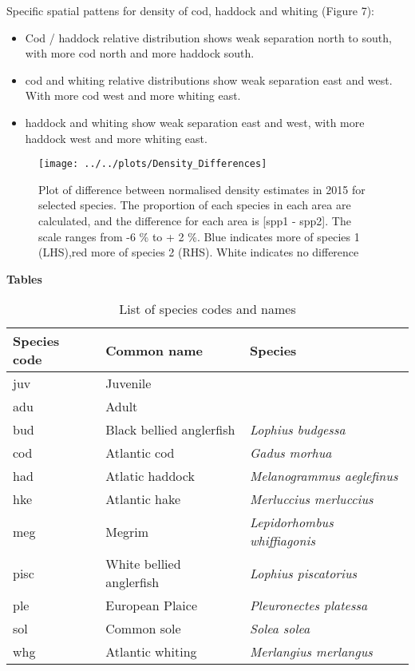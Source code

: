 \documentclass[11pt]{article}
\begin{document}
\newpage

Specific spatial pattens for density of cod, haddock and whiting (Figure 7):

\begin{itemize}
	\item Cod / haddock relative distribution shows weak separation north to
	south, with more cod north and more haddock south.
	\item cod and whiting relative distributions show weak separation east
		and west. With more cod west and more whiting east.
	\item haddock and whiting show weak separation east and west, with
		more haddock west and more whiting east.
\end{itemize}

\begin{figure}[!ht]
	\texttt{[image: ../../plots/Density\_Differences]}
	\label{fig:DensityDiff}
	\caption{Plot of difference between normalised density estimates in
		2015 for selected species. The proportion of each species in
		each area are calculated, and the difference for each area is
		[spp1 - spp2]. The scale ranges from -6 \% to + 2 \%. Blue indicates
		more of species 1 (LHS),red more of species 2 (RHS).  White
		indicates no difference}
\end{figure}



\newpage

\textbf{Tables}

\begin{table}[!ht]
	\caption{List of species codes and names}
	\center
	\begin{tabular}{ p{3cm} p{4cm} p{5cm} }
		\hline
		Species code & Common name              & Species \\
		\hline
		juv          & Juvenile                 & \\
		adu          & Adult                    & \\
		\hline
		bud          & Black bellied anglerfish & \textit{Lophius budgessa} \\
		cod          & Atlantic cod             & \textit{Gadus morhua} \\
		had          & Atlatic haddock          & \textit{Melanogrammus aeglefinus} \\
		hke          & Atlantic hake            & \textit{Merluccius merluccius} \\
		meg          & Megrim                   & \textit{Lepidorhombus whiffiagonis} \\
		pisc         & White bellied anglerfish & \textit{Lophius piscatorius}	\\
		ple          & European Plaice          & \textit{Pleuronectes platessa} \\
		sol          & Common sole              & \textit{Solea solea} \\
		whg          & Atlantic whiting         & \textit{Merlangius merlangus} \\
		\hline
	\end{tabular}
\end{table}
\end{document}
